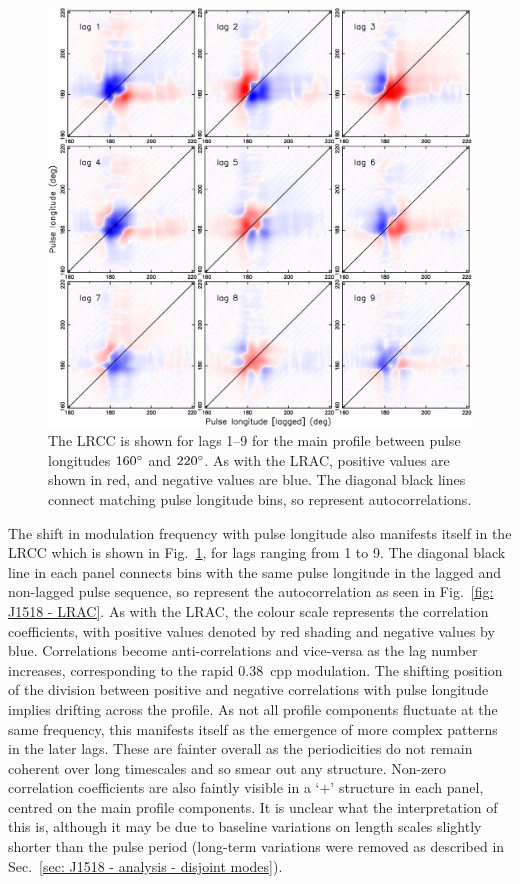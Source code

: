 \begin{figure}
    \begin{center}
        \includegraphics[width=1.0\textwidth]{Figures/J1518/LRCC}
        \caption[The longitude-resolved cross-correlation spectrum]{The LRCC is shown for lags 1--9 for the main profile between pulse longitudes $160^\circ$ and $220^\circ$. As with the LRAC, positive values are shown in red, and negative values are blue.  The diagonal black lines connect matching pulse longitude bins, so represent autocorrelations.}
        \label{fig: J1518 - LRCC}
    \end{center}
\end{figure}
The shift in modulation frequency with pulse longitude also manifests itself in the LRCC which is shown in Fig.~\ref{fig: J1518 - LRCC}, for lags ranging from 1 to 9. The diagonal black line in each panel connects bins with the same pulse longitude in the lagged and non-lagged pulse sequence, so represent the autocorrelation as seen in Fig.~\ref{fig: J1518 - LRAC}. As with the LRAC, the colour scale represents the correlation coefficients, with positive values denoted by red shading and negative values by blue. Correlations become anti-correlations and vice-versa as the lag number increases, corresponding to the rapid $0.38$~cpp modulation. The shifting position of the division between positive and negative correlations with pulse longitude implies drifting across the profile. As not all profile components fluctuate at the same frequency, this manifests itself as the emergence of more complex patterns in the later lags. These are fainter overall as the periodicities do not remain coherent over long timescales and so smear out any structure. Non-zero correlation coefficients are also faintly visible in a `$+$' structure in each panel, centred on the main profile components. It is unclear what the interpretation of this is, although it may be due to baseline variations on length scales slightly shorter than the pulse period (long-term variations were removed as described in Sec.~\ref{sec: J1518 - analysis - disjoint modes}).

